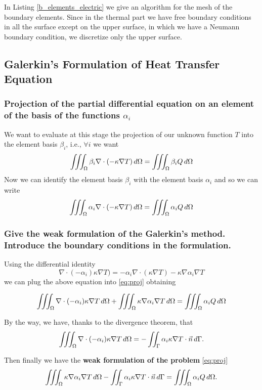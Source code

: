 In Listing \ref{b_elements_electric} we give an algorithm for the mesh of the boundary elements. Since in the thermal part we have free boundary conditions in all the surface except on the upper surface, in which we have a Neumann boundary condition, we discretize only the upper surface. 


\subsection{Galerkin’s Formulation of Heat Transfer Equation}
\subsubsection{Projection of the partial differential equation on an element of the basis of the functions $ \alpha_i $}
We want to evaluate at this stage the projection of our unknown function $ T $ into the element basis $ \beta_i $, i.e., $ \forall i $ we want 
\begin{equation}
\label{eq:proj}
\iiint_{\Omega}\beta_i\nabla\cdot(-\kappa\nabla T)\mathop{}\!d\Omega=\iiint_{\Omega}\beta_i Q\mathop{}\!d\Omega
\end{equation} 
Now we can identify the element basis $ \beta_i $ with the element basis $ \alpha_i $ and so we can write  
\[\iiint_{\Omega}\alpha_i\nabla\cdot(-\kappa\nabla T)\mathop{}\!d\Omega=\iiint_{\Omega}\alpha_i Q\mathop{}\!d\Omega \]

\subsubsection{Give the weak formulation of the Galerkin’s method. Introduce the boundary conditions in the formulation.}
Using the differential identity 
\[\nabla\cdot(-\alpha_i)\kappa\nabla T)=-\alpha_i\nabla\cdot(\kappa\nabla T)-\kappa\nabla\alpha_i\nabla T\]
we can plug the above equation into \eqref{eq:proj} obtaining 

\[\iiint_{\Omega}\nabla\cdot(-\alpha_i)\kappa\nabla T\mathop{}\!d\Omega+\iiint_{\Omega}\kappa\nabla\alpha_i\nabla T\mathop{}\!d\Omega=\iiint_{\Omega}\alpha_i Q\mathop{}\!d\Omega\]

By the way, we have, thanks to the divergence theorem, that 
\[\iiint_{\Omega}\nabla\cdot(-\alpha_i)\kappa\nabla T\mathop{}\!d\Omega=-\iint_{\Gamma}\alpha_i\kappa\nabla T\cdot\vec{n}\mathop{}\!d\Gamma. \]

Then finally we have the \textbf{weak formulation of the problem} \eqref{eq:proj}
\[ \iiint_{\Omega}\kappa\nabla\alpha_i\nabla T\mathop{}\!d\Omega-\iint_{\Gamma}\alpha_i\kappa\nabla T\cdot\vec{n}\mathop{}\!d\Gamma=\iiint_{\Omega}\alpha_i Q\mathop{}\!d\Omega. \]
\medskip

